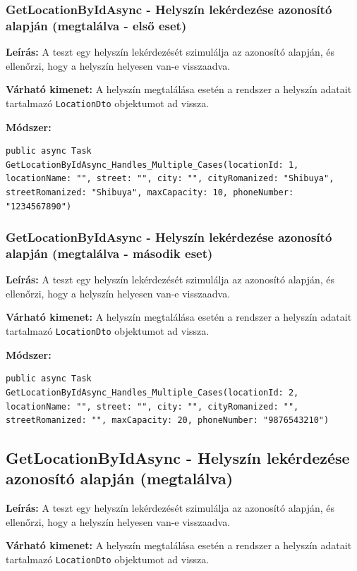 \documentclass{report}[11pt]
\begin{document}
\subsubsection{GetLocationByIdAsync - Helyszín lekérdezése azonosító alapján (megtalálva - első eset)}
\textbf{Leírás:} A teszt egy helyszín lekérdezését szimulálja az azonosító alapján, és ellenőrzi, hogy a helyszín helyesen van-e visszaadva.

\textbf{Várható kimenet:} A helyszín megtalálása esetén a rendszer a helyszín adatait tartalmazó \texttt{LocationDto} objektumot ad vissza.

\textbf{Módszer:} 
\begin{lstlisting}
public async Task GetLocationByIdAsync_Handles_Multiple_Cases(locationId: 1, locationName: "", street: "", city: "", cityRomanized: "Shibuya", streetRomanized: "Shibuya", maxCapacity: 10, phoneNumber: "1234567890")
\end{lstlisting}

\subsubsection{GetLocationByIdAsync - Helyszín lekérdezése azonosító alapján (megtalálva - második eset)}
\textbf{Leírás:} A teszt egy helyszín lekérdezését szimulálja az azonosító alapján, és ellenőrzi, hogy a helyszín helyesen van-e visszaadva.

\textbf{Várható kimenet:} A helyszín megtalálása esetén a rendszer a helyszín adatait tartalmazó \texttt{LocationDto} objektumot ad vissza.

\textbf{Módszer:} 
\begin{lstlisting}
public async Task GetLocationByIdAsync_Handles_Multiple_Cases(locationId: 2, locationName: "", street: "", city: "", cityRomanized: "", streetRomanized: "", maxCapacity: 20, phoneNumber: "9876543210")
\end{lstlisting}

\subsection{GetLocationByIdAsync - Helyszín lekérdezése azonosító alapján (megtalálva)}
\textbf{Leírás:} A teszt egy helyszín lekérdezését szimulálja az azonosító alapján, és ellenőrzi, hogy a helyszín helyesen van-e visszaadva.

\textbf{Várható kimenet:} A helyszín megtalálása esetén a rendszer a helyszín adatait tartalmazó \texttt{LocationDto} objektumot ad vissza.
\end{document}
